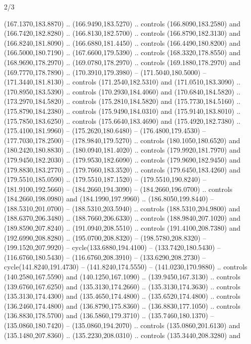 \begin{flagdescription}{2/3}
\begin{scope}[xshift=0.5\flaglength,yshift=0.5\flagwidth,scale=\stretchfactor]
\begin{scope}[scale=0.001645\flagwidth,yshift=65mm,xshift=-63mm]
\begin{scope}[y=0.80pt, x=0.80pt, yscale=-1,]
\begin{scope}[cm={{1.33333,0.0,0.0,1.33333,(0.0,1e-05)}}]
  (167.1370,183.8870) .. (166.9490,183.5270) .. controls (166.8090,183.2580) and
  (166.7420,182.8280) .. (166.8130,182.5700) .. controls (166.8790,182.3130) and
  (166.8240,181.8090) .. (166.6880,181.4450) .. controls (166.4490,180.8200) and
  (166.5000,180.7190) .. (167.6600,179.5390) .. controls (168.3320,178.8550) and
  (168.9690,178.2970) .. (169.0780,178.2970) .. controls (169.1880,178.2970) and
  (169.7770,178.7890) .. (170.3910,179.3980) -- (171.5040,180.5000) --
  (171.3440,181.8130) .. controls (171.2540,182.5310) and (171.0510,183.3090) ..
  (170.8950,183.5390) .. controls (170.2930,184.4060) and (170.6840,184.5820) ..
  (173.2970,184.5820) .. controls (175.2810,184.5820) and (175.7730,184.5160) ..
  (175.8790,184.2380) .. controls (175.9490,184.0310) and (175.9140,183.8010) ..
  (175.7850,183.6250) .. controls (175.6640,183.4690) and (175.4920,182.7380) ..
  (175.4100,181.9960) -- (175.2620,180.6480) -- (176.4800,179.4530) --
  (177.7030,178.2500) -- (178.9840,179.5270) .. controls (180.1050,180.6520) and
  (180.2420,180.8830) .. (180.0940,181.4020) .. controls (179.9920,181.7970) and
  (179.9450,182.2030) .. (179.9530,182.6090) .. controls (179.9690,182.9450) and
  (179.8830,183.2770) .. (179.7660,183.3520) .. controls (179.6450,183.4260) and
  (179.5510,185.0590) .. (179.5510,187.1520) -- (179.5510,190.8240) --
  (181.9100,192.5660) -- (184.2660,194.3090) -- (184.2660,196.0700) .. controls
  (184.2660,198.0980) and (184.1990,197.9960) .. (186.8050,199.8440) --
  (188.5310,201.0700) -- (188.5310,203.5940) .. controls (188.5310,204.9800) and
  (188.6370,206.3480) .. (188.7660,206.6330) .. controls (188.9840,207.1020) and
  (189.8590,207.8240) .. (191.0940,208.5510) .. controls (191.4100,208.7380) and
  (192.6990,208.8280) .. (195.0700,208.8320) -- (198.5780,208.8320) --
  (199.1520,207.9920) -- cycle(133.6880,194.4100) -- (133.7420,180.5430) --
  (116.6760,180.5430) -- (116.6760,208.3910) -- (133.6290,208.2730) --
  cycle(141.8240,191.4730) -- (141.8240,174.5550) -- (141.0230,170.9880) ..
  controls (140.2580,167.5590) and (140.1250,167.1090) .. (139.9450,167.3130) ..
  controls (139.6760,167.6250) and (135.3130,174.2660) .. (135.3130,174.3630) ..
  controls (135.3130,174.4300) and (135.4650,174.4800) .. (135.6520,174.4800) ..
  controls (136.2460,174.4800) and (136.8790,175.8360) .. (136.8830,177.1050) ..
  controls (136.8830,178.5700) and (136.5860,179.3710) .. (135.7460,180.1370) --
  (135.0860,180.7420) -- (135.0860,194.2070) .. controls (135.0860,201.6130) and
  (135.1480,207.8360) .. (135.2230,208.0310) .. controls (135.3440,208.3280) and

\end{scope}
\end{scope}
\end{scope}
\end{scope}
\end{flagdescription}
